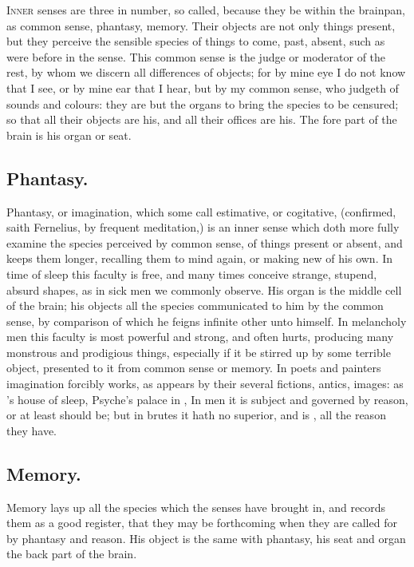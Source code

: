 \lettrine{I}{nner} senses are three in number, so called, because they be
within the brainpan, as common sense, phantasy, memory. Their objects are not
only things present, but they perceive the sensible species of things to come,
past, absent, such as were before in the sense. This common sense is the judge
or moderator of the rest, by whom we discern all differences of objects; for by
mine eye I do not know that I see, or by mine ear that I hear, but by my common
sense, who judgeth of sounds and colours: they are but the organs to bring the
species to be censured; so that all their objects are his, and all their
offices are his. The fore part of the brain is his organ or seat.

\subsection{Phantasy.}

Phantasy, or imagination, which some call estimative, or cogitative,
(confirmed, saith Fernelius, by frequent meditation,) is an
inner sense which doth more fully examine the species perceived by common
sense, of things present or absent, and keeps them longer, recalling them to
mind again, or making new of his own. In time of sleep this faculty is free,
and many times conceive strange, stupend, absurd shapes, as in sick men we
commonly observe. His organ is the middle cell of the brain; his objects all
the species communicated to him by the common sense, by comparison of which he
feigns infinite other unto himself. In melancholy men this faculty is most
powerful and strong, and often hurts, producing many monstrous and prodigious
things, especially if it be stirred up by some terrible object, presented to it
from common sense or memory. In poets and painters imagination forcibly works,
as appears by their several fictions, antics, images: as \Ovid{}'s house of sleep,
Psyche's palace in \Apuleius{}, \etc{} In men it is subject and governed by
reason, or at least should be; but in brutes it hath no superior, and is
, all the reason they have.

\subsection{Memory.}

Memory lays up all the species which the senses have
brought in, and records them as a good register, that they may be forthcoming
when they are called for by phantasy and reason. His object is the same with
phantasy, his seat and organ the back part of the brain.


